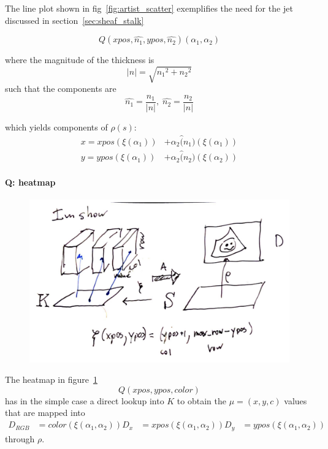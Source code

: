 \documentclass[../main.tex]{subfiles}
\begin{document}
The line plot shown in fig~\ref{fig:artist_scatter} exemplifies the need for the jet discussed in section~\ref{sec:sheaf_stalk}


\begin{equation}
    Q(xpos, \hat{n_{1}}, ypos, \hat{n_{2}})(\alpha_1, \alpha_2)
\end{equation}

where the magnitude of the thickness is 
\begin{equation}
    \lvert n \rvert = \sqrt{{n_{1}}^2 + {n_{2}}^2}
\end{equation}
such that the components are 
\begin{equation}
    \hat{n_{1}} = \frac{n_1}{\lvert n \rvert}, \; \hat{n_{2}} = \frac{n_2}{\lvert n \rvert}
\end{equation}
    
which yields components of $\rho(s)$:
\begin{align}
 x = xpos(\xi(\alpha_1)) &+ \alpha_2\hat(n_1)(\xi(\alpha_1)) \\
 y = ypos(\xi(\alpha_1)) &+ \alpha_2\hat(n_2)(\xi(\alpha_2)) 
\end{align}


\paragraph{Q: heatmap}
\begin{figure}[h!]
    \includegraphics[width=\textwidth]{figures/math/heatmap.png}
    \label{fig:artist_heatmap}
\end{figure}
The heatmap in figure~\ref{fig:artist_heatmap} 
\begin{equation}
Q(xpos, ypos, color)
\end{equation}
has in the simple case a direct lookup into $K$ to obtain the $\mu = (x,y,c)$ values that are mapped into 
\begin{align}
D_{RGB} &= color(\xi(\alpha_1, \alpha_2))
D_x & = xpos(\xi(\alpha_1, \alpha_2))
D_y &= ypos(\xi(\alpha_1, \alpha_2))
\end{align}
through $\rho$. 
\end{document}

